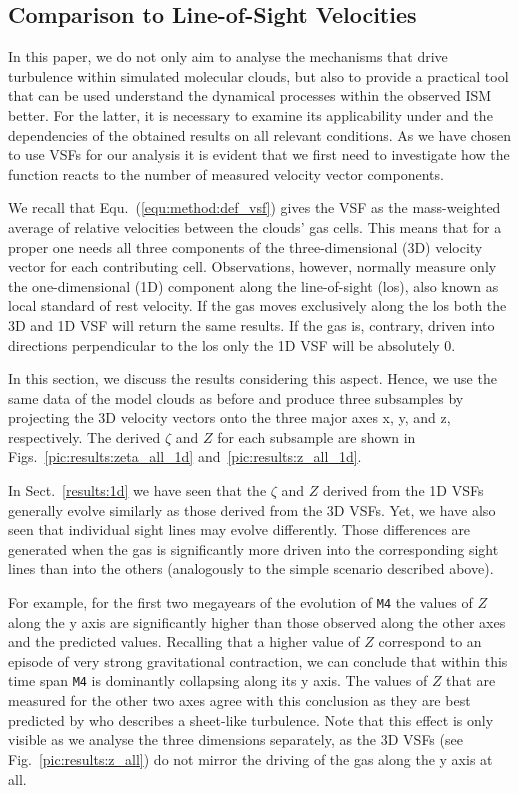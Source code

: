 \subsection{Comparison to Line-of-Sight Velocities}\label{discussion:1d}

In this paper, we do not only aim to analyse the mechanisms that drive turbulence within simulated molecular clouds, but also to provide a practical tool that can be used understand the dynamical processes within the observed ISM better.
For the latter, it is necessary to examine its applicability under and the dependencies of the obtained results on all relevant conditions. 
As we have chosen to use VSFs for our analysis it is evident that we first need to investigate how the function reacts to the number of measured velocity vector components. 

We recall that Equ.~(\ref{equ:method:def_vsf}) gives the VSF  as the mass-weighted average of relative velocities between the clouds' gas cells.
This means that for a proper one needs all three components of the three-dimensional (3D) velocity vector for each contributing cell.
Observations, however, normally measure only the one-dimensional (1D) component along the line-of-sight (los), also known as local standard of rest velocity.
If the gas moves exclusively along the los both the 3D and 1D VSF will return the same results. 
If the gas is, contrary, driven into directions perpendicular to the los only the 1D VSF will be absolutely 0.
 
In this section, we discuss the results considering this aspect.
Hence, we use the same data of the model clouds as before and produce three subsamples by projecting the 3D velocity vectors onto the three  major axes x, y, and z, respectively.
The derived $\zeta$ and $Z$ for each subsample are shown in Figs.~\ref{pic:results:zeta_all_1d} and~\ref{pic:results:z_all_1d}.

In Sect.~\ref{results:1d} we have seen that the $\zeta$ and $Z$ derived from the 1D VSFs generally evolve similarly as those derived from the 3D VSFs.
Yet, we have also seen that individual sight lines may evolve differently.
Those differences are generated when the gas is significantly more driven into the corresponding sight lines than into the others (analogously to the simple scenario described above). 

For example, for the first two megayears of the evolution of \texttt{M4} the values of $Z$ along the y axis are significantly higher than those observed along the other axes and the predicted values.
Recalling that a higher value of $Z$ correspond to an episode of very strong gravitational contraction, we can conclude that within this time span \texttt{M4} is dominantly collapsing along its y axis. 
The values of $Z$ that are measured for the other two axes agree with this conclusion as they are best predicted by \citet{Boldyrev2002} who describes a sheet-like turbulence. 
Note that this effect is only visible as we analyse the three dimensions separately, as the 3D VSFs (see Fig.~\ref{pic:results:z_all}) do not mirror the driving of the gas along the y axis at all.

